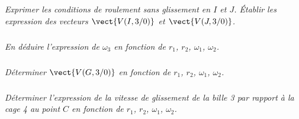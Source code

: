 \subparagraph{}
\textit{Exprimer les conditions de roulement sans glissement en $I$ et $J$. Établir les expression des vecteurs $\vect{V(I,3/0)}$ et $\vect{V(J,3/0)}$.}


\subparagraph{}
\textit{En déduire l'expression de $\omega_3$ en fonction de $r_1$, $r_2$, $\omega_1$, $\omega_2$.}



\subparagraph{}
\textit{Déterminer $\vect{V(G,3/0)}$ en fonction de $r_1$, $r_2$, $\omega_1$, $\omega_2$.}


\subparagraph{}
\textit{Déterminer l'expression de la vitesse de glissement de la bille 3 par rapport à la cage 4 au point $C$ en fonction de $r_1$, $r_2$, $\omega_1$, $\omega_2$.}

